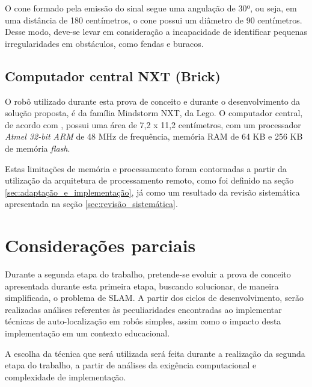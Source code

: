 \begin{itemize}
				O cone formado pela emissão do sinal segue uma angulação de 30º, ou seja, em uma distância de 180 centímetros, o cone possui um diâmetro de 90 centímetros. Desse modo, deve-se levar em consideração a incapacidade de identificar pequenas irregularidades em obstáculos, como fendas e buracos.

		\end{itemize}

		\subsection{Computador central NXT (Brick)} %
		\label{sub:brick}

			O robô utilizado durante esta prova de conceito e durante o desenvolvimento da solução proposta, é da família Mindstorm NXT, da Lego. O computador central, de acordo com \cite{legonxj}, possui uma área de 7,2 x 11,2 centímetros, com um processador \textit{Atmel 32-bit ARM} de 48 MHz de frequência, memória RAM de 64 KB e 256 KB de memória \textit{flash}.

			Estas limitações de memória e processamento foram contornadas a partir da utilização da arquitetura de processamento remoto, como foi definido na seção \ref{sec:adaptação_e_implementação}, já como um resultado da revisão sistemática apresentada na seção \ref{sec:revisão_sistemática}.
		




\section{Considerações parciais} %
\label{sec:consideracoes}

	Durante a segunda etapa do trabalho, pretende-se evoluir a prova de conceito apresentada durante esta primeira etapa, buscando solucionar, de maneira simplificada, o problema de SLAM. A partir dos ciclos de desenvolvimento, serão realizadas análises referentes às peculiaridades encontradas ao implementar técnicas de auto-localização em robôs simples, assim como o impacto desta implementação em um contexto educacional.

	A escolha da técnica que será utilizada será feita durante a realização da segunda etapa do trabalho, a partir de análises da exigência computacional e complexidade de implementação.

